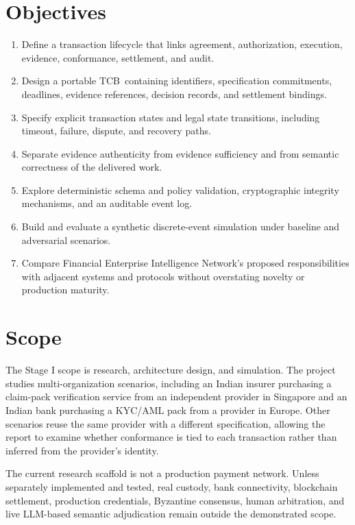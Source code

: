 \documentclass[12pt,a4paper,oneside]{report}
\newcommand{\TCB}{TCB}
\begin{document}
\section{Objectives}
\begin{enumerate}[leftmargin=*]
\item Define a transaction lifecycle that links agreement, authorization, execution, evidence, conformance, settlement, and audit.
\item Design a portable \TCB\ containing identifiers, specification commitments, deadlines, evidence references, decision records, and settlement bindings.
\item Specify explicit transaction states and legal state transitions, including timeout, failure, dispute, and recovery paths.
\item Separate evidence authenticity from evidence sufficiency and from semantic correctness of the delivered work.
\item Explore deterministic schema and policy validation, cryptographic integrity mechanisms, and an auditable event log.
\item Build and evaluate a synthetic discrete-event simulation under baseline and adversarial scenarios.
\item Compare Financial Enterprise Intelligence Network's proposed responsibilities with adjacent systems and protocols without overstating novelty or production maturity.
\end{enumerate}

\section{Scope}
The Stage I scope is research, architecture design, and simulation. The project studies multi-organization scenarios, including an Indian insurer purchasing a claim-pack verification service from an independent provider in Singapore and an Indian bank purchasing a KYC/AML pack from a provider in Europe. Other scenarios reuse the same provider with a different specification, allowing the report to examine whether conformance is tied to each transaction rather than inferred from the provider's identity.

The current research scaffold is not a production payment network. Unless separately implemented and tested, real custody, bank connectivity, blockchain settlement, production credentials, Byzantine consensus, human arbitration, and live LLM-based semantic adjudication remain outside the demonstrated scope.
\end{document}
